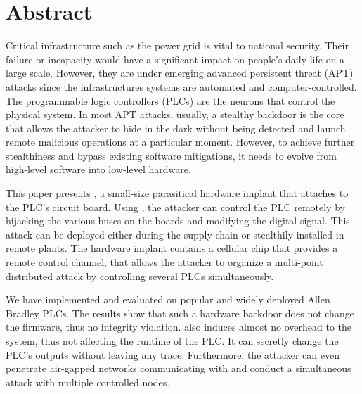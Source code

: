 \section{Abstract}
\label{sec:implant-abstract}


Critical infrastructure such as the power grid is vital to national security.
Their failure or incapacity would have a significant impact on people's daily life on a large scale. However, they are under emerging advanced persistent threat (APT) attacks since the infrastructures systems are automated and computer-controlled. The programmable logic controllers (PLCs) are the neurons that control the physical system. In most APT attacks, usually, a stealthy backdoor is the core that allows the attacker to hide in the dark without being detected and launch remote malicious operations at a particular moment. However, to achieve further stealthiness and bypass existing software mitigations, it needs to evolve from high-level software into low-level hardware.

This paper presents \name, a small-size parasitical hardware implant that attaches to the PLC's circuit board. Using \name, the attacker can control the PLC remotely by hijacking the various buses on the boards and modifying the digital signal. This attack can be deployed either during the supply chain or stealthily installed in remote plants. The hardware implant contains a cellular chip that provides a remote control channel, that allows the attacker to organize a multi-point distributed attack by controlling several PLCs simultaneously.

We have implemented and evaluated \name on popular and widely deployed Allen Bradley PLCs. The results show that such a hardware backdoor does not change the firmware, thus no integrity violation. \name also induces almost no overhead to the system, thus not affecting the runtime of the PLC. It can secretly change the PLC's outputs without leaving any trace. Furthermore, the attacker can even penetrate air-gapped networks communicating with \name and conduct a simultaneous attack with multiple controlled nodes.

